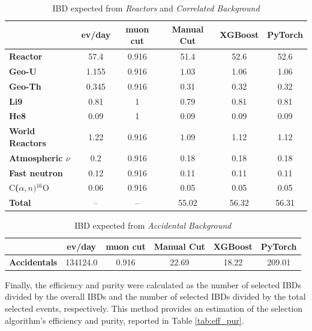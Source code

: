 \begin{table}[h]
	\centering
        \small
	\begin{tabular}{lcc|ccc}
		\toprule
		& \textbf{ev/day} & \textbf{muon cut} & \textbf{Manual Cut} & \textbf{XGBoost} & \textbf{PyTorch} \\
		\midrule
		\textbf{Reactor} & 57.4 & 0.916 & 51.4 & 52.6 & 52.6 \\
		\midrule
		\textbf{Geo-U} & 1.155 & 0.916 & 1.03 & 1.06 & 1.06 \\
		\textbf{Geo-Th} & 0.345 & 0.916 & 0.31 & 0.32 & 0.32 \\
		\textbf{Li9} & 0.81 & 1 & 0.79 & 0.81 & 0.81 \\
		\textbf{He8} & 0.09 & 1 & 0.09 & 0.09 & 0.09 \\
		\textbf{World Reactors} & 1.22 & 0.916 & 1.09 & 1.12 & 1.12 \\
		\textbf{Atmospheric $\nu$} & 0.2 & 0.916 & 0.18 & 0.18 & 0.18 \\
		\textbf{Fast neutron} & 0.12 & 0.916 & 0.11 & 0.11 & 0.11 \\
		\textbf{$\mathrm{C}$($\alpha,n)$$^{16}\mathrm{O}$} & 0.06 & 0.916 & 0.05 & 0.05 & 0.05 \\
		\textbf{Total} & -- & -- & 55.02 & 56.32 & 56.31 \\
		\bottomrule
	\end{tabular}
	\caption{IBD expected from \textit{Reactors} and \textit{Correlated Background}}
	\label{tab:correlated}
\end{table}

\begin{table}[h]
	\centering
        \small
	\begin{tabular}{lcc|ccc}
		\toprule
		& \textbf{ev/day} & \textbf{muon cut} & \textbf{Manual Cut} & \textbf{XGBoost} & \textbf{PyTorch} \\
		\midrule
		\textbf{Accidentals} & 134124.0 & 0.916 & 22.69 & 18.22 & 209.01 \\
		\bottomrule
	\end{tabular}
	\caption{IBD expected from \textit{Accidental Background}}
	\label{tab:accidentals}
\end{table}
	

Finally, the efficiency and purity were calculated as the number of selected IBDs divided by the overall IBDs and the number of selected IBDs divided by the total selected events, respectively. This method provides an estimation of the selection algorithm's efficiency and purity, reported in Table \ref{tab:eff_pur}.


